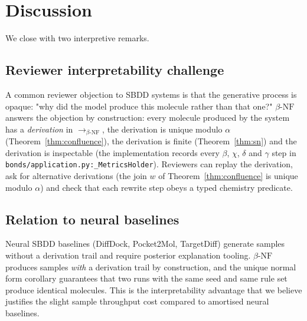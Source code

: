 \documentclass{article}
\theoremstyle{definition}
\newcommand{\bnf}{\beta\text{-NF}}
\newcommand{\stepstoAll}{\longrightarrow_{\bnf}}
\begin{document}
\section{Discussion}
\label{sec:discussion}
We close with two interpretive remarks.

\subsection{Reviewer interpretability challenge}
A common reviewer objection to SBDD systems is that the generative process
is opaque: "why did the model produce this molecule rather than that one?"
$\bnf$ answers the objection by construction: every molecule produced by
the system has a \emph{derivation} in $\stepstoAll$, the derivation is
unique modulo $\alpha$ (Theorem~\ref{thm:confluence}), the derivation is
finite (Theorem~\ref{thm:sn}) and the derivation is inspectable (the
implementation records every $\beta$, $\chi$, $\delta$ and $\gamma$ step
in \texttt{bonds/application.py:\_MetricsHolder}). Reviewers can replay
the derivation, ask for alternative derivations (the join $w$ of
Theorem~\ref{thm:confluence} is unique modulo $\alpha$) and check that
each rewrite step obeys a typed chemistry predicate.

\subsection{Relation to neural baselines}
Neural SBDD baselines (DiffDock, Pocket2Mol, TargetDiff) generate samples
without a derivation trail and require posterior explanation tooling.
$\bnf$ produces samples \emph{with} a derivation trail by construction,
and the unique normal form corollary guarantees that two runs with the
same seed and same rule set produce identical molecules. This is the
interpretability advantage that we believe justifies the slight sample
throughput cost compared to amortised neural baselines.
\end{document}
